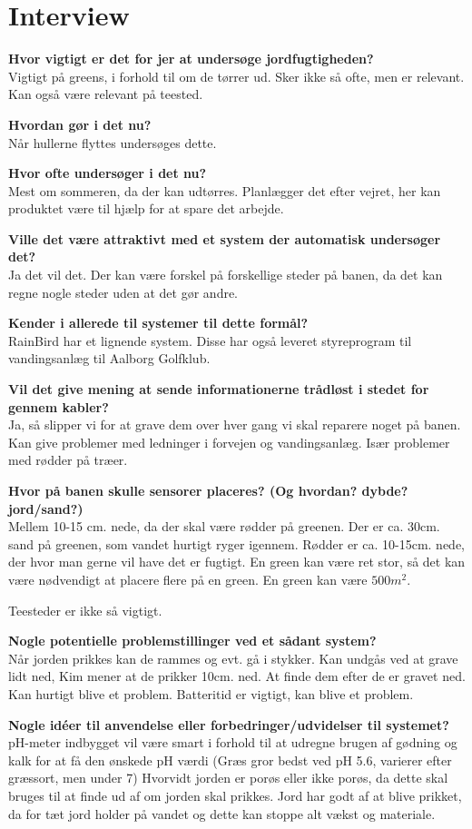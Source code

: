 \chapter{Interview}
\textbf{Hvor vigtigt er det for jer at undersøge jordfugtigheden?}\\
Vigtigt på greens, i forhold til om de tørrer ud. Sker ikke så ofte, men er relevant.
Kan også være relevant på teested.

\textbf{Hvordan gør i det nu?}\\
Når hullerne flyttes undersøges dette.

\textbf{Hvor ofte undersøger i det nu?}\\
Mest om sommeren, da der kan udtørres. Planlægger det efter vejret, her kan produktet være til hjælp for at spare det arbejde.

\textbf{Ville det være attraktivt med et system der automatisk undersøger det?}\\
Ja det vil det. Der kan være forskel på forskellige steder på banen, da det kan regne nogle steder uden at det gør andre.

\textbf{Kender i allerede til systemer til dette formål?}\\
RainBird har et lignende system. Disse har også leveret styreprogram til vandingsanlæg til Aalborg Golfklub.

\textbf{Vil det give mening at sende informationerne trådløst i stedet for gennem kabler?}\\
Ja, så slipper vi for at grave dem over hver gang vi skal reparere noget på banen. Kan give problemer med ledninger i forvejen og vandingsanlæg. Især problemer med rødder på træer.

\textbf{Hvor på banen skulle sensorer placeres? (Og hvordan? dybde? jord/sand?)}\\
Mellem 10-15 cm. nede, da der skal være rødder på greenen. Der er ca. 30cm. sand på greenen, som vandet hurtigt ryger igennem. Rødder er ca. 10-15cm. nede, der hvor man gerne vil have det er fugtigt.
En green kan være ret stor, så det kan være nødvendigt at placere flere på en green. En green kan være $500m^2$.

Teesteder er ikke så vigtigt.

\textbf{Nogle potentielle problemstillinger ved et sådant system?}\\
Når jorden prikkes kan de rammes og evt. gå i stykker. Kan undgås ved at grave lidt ned, Kim mener at de prikker 10cm. ned. 
At finde dem efter de er gravet ned. Kan hurtigt blive et problem. Batteritid er vigtigt, kan blive et problem.

\textbf{Nogle idéer til anvendelse eller forbedringer/udvidelser til systemet?}\\
pH-meter indbygget vil være smart i forhold til at udregne brugen af gødning og kalk for at få den ønskede pH værdi (Græs gror bedst ved pH 5.6, varierer efter græssort, men under 7)
Hvorvidt jorden er porøs eller ikke porøs, da dette skal bruges til at finde ud af om jorden skal prikkes.
Jord har godt af at blive prikket, da for tæt jord holder på vandet og dette kan stoppe alt vækst og materiale.
